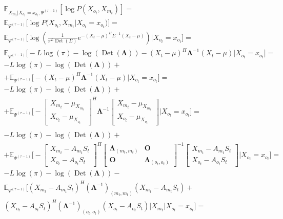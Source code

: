 \documentclass[11pt]{article}
\newcommand{\Expect}{\mathbb{E}}
\DeclareMathOperator{\Det}{Det}
\begin{document}
\begin{equation*}
\begin{gathered}
\Expect_{X_{m_t}|X_{o_t}=x_{o_t}, \Psi^{(\tau-1)}}[\log P(X_{o_t}, X_{m_t})]=\\
\Expect_{\Psi^{(\tau-1)}}\Big[\log P\Big(X_{o_t}, X_{m_t}\Big|X_{o_t}=x_{o_t}\Big)\Big]=\\
\Expect_{\Psi^{(\tau-1)}}\bigg[\log \left(\frac{1}{\pi^{L}\Det(\Sigma)}e^{-(X_t-\mu)^H\Sigma^{-1}(X_t-\mu)}\right)\Big|X_{o_t}=x_{o_t}\bigg]=\\
\Expect_{\Psi^{(\tau-1)}}\bigg[-L \log(\pi) - \log (\Det(\mathbf{\Lambda})) - (X_t - \mu)^H\mathbf{\Lambda}^{-1}(X_t - \mu)\Big|X_{o_t}=x_{o_t}\bigg]=\\
-L \log(\pi) - \log (\Det(\mathbf{\Lambda})) + \\ + \Expect_{\Psi^{(\tau-1)}}\bigg[- (X_t - \mu)^H\mathbf{\Lambda}^{-1}(X_t - \mu)\Big|X_{o_t}=x_{o_t}\bigg]=\\
-L \log(\pi) - \log (\Det(\mathbf{\Lambda}))  + \\ + \Expect_{\Psi^{(\tau-1)}}\bigg[- 
\begin{bmatrix} X_{m_t} - \mu_{X_{m_t}} \\  X_{o_t} - \mu_{X_{o_t}} \end{bmatrix}^H \mathbf{\Lambda}^{-1}
\begin{bmatrix} X_{m_t} - \mu_{X_{m_t}} \\  X_{o_t} - \mu_{X_{o_t}} \end{bmatrix}\Big|X_{o_t}=x_{o_t}\bigg] = \\
\end{gathered}
\end{equation*}
\begin{equation*}
\begin{gathered}
-L \log(\pi) - \log (\Det(\mathbf{\Lambda}))  + \\ + \Expect_{\Psi^{(\tau-1)}}\bigg[- 
\begin{bmatrix} X_{m_t} - A_{m_t}S_t \\  X_{o_t} - A_{o_t}S_t  \end{bmatrix}^H
\begin{bmatrix} \mathbf{\Lambda}_{(m_t, m_t)} & \mathbf{O} \\  \mathbf{O} & \mathbf{\Lambda}_{(o_t, o_t)} \end{bmatrix}^{-1}
\begin{bmatrix} X_{m_t} - A_{m_t}S_t \\  X_{o_t} - A_{o_t}S_t  \end{bmatrix}\Big|X_{o_t}=x_{o_t}\bigg] = \\
-L \log(\pi) - \log (\Det(\mathbf{\Lambda}))  - \\ \Expect_{\Psi^{(\tau-1)}}
\bigg[ (X_{m_t} - A_{m_t}S_t)^H (\mathbf{\Lambda}^{-1})_{(m_t, m_t)} (X_{m_t} - A_{m_t}S_t) + \\
(X_{o_t} - A_{o_t}S_t)^H (\mathbf{\Lambda}^{-1})_{(o_t, o_t)} (X_{o_t} - A_{o_t}S_t)
\Big|X_{m_t}|X_{o_t}=x_{o_t}\bigg] = \\
\end{gathered}
\end{equation*}
\end{document}
